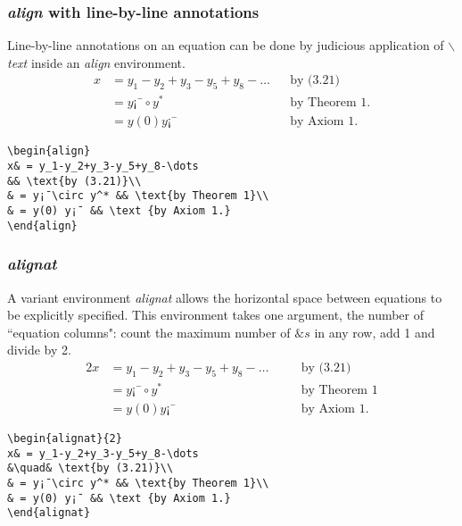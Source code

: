 \documentclass[12pt]{beamer}
\begin{document}
\begin{frame}[fragile]
  \frametitle{\emph{align} with line-by-line annotations}
  Line-by-line annotations on an equation can be done by judicious application of $\backslash$\emph{text} inside an \emph{align} environment.\\
  \begin{align}
    x& = y_1-y_2+y_3-y_5+y_8-\dots
    && \text{by (3.21)}\\
    & = y¡¯\circ y^* && \text{by Theorem 1.}\\
    & = y(0) y¡¯ && \text {by Axiom 1.}
  \end{align}
  \begin{verbatim}
\begin{align}
x& = y_1-y_2+y_3-y_5+y_8-\dots
&& \text{by (3.21)}\\
& = y¡¯\circ y^* && \text{by Theorem 1}\\
& = y(0) y¡¯ && \text {by Axiom 1.}
\end{align}
  \end{verbatim}

\end{frame}
\begin{frame}[fragile]
  \frametitle{\emph{alignat}}
  A variant environment \emph{alignat} allows the horizontal space between equations to be explicitly specified. This environment takes one argument, the number of ``equation columns": count the maximum number of $\&s$ in any row, add 1 and divide by 2.
  \small{\begin{alignat}{2}
    x& = y_1-y_2+y_3-y_5+y_8-\dots
    &\quad& \text{by (3.21)}\\
    & = y¡¯\circ y^* && \text{by Theorem 1}\\
    & = y(0) y¡¯ && \text {by Axiom 1.}
  \end{alignat}}
  \small{\begin{verbatim}
\begin{alignat}{2}
x& = y_1-y_2+y_3-y_5+y_8-\dots
&\quad& \text{by (3.21)}\\
& = y¡¯\circ y^* && \text{by Theorem 1}\\
& = y(0) y¡¯ && \text {by Axiom 1.}
\end{alignat}
  \end{verbatim}}
\end{frame}
\end{document}
